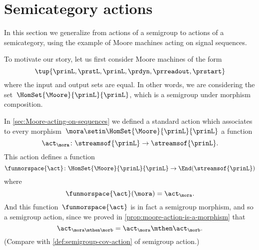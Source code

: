 
\section{Semicategory actions}
\label{sec:action-of-a-category}


In this section we generalize from actions of a semigroup to actions of a semicategory, using the example of Moore machines acting on signal sequences.

To motivate our story, let us first consider Moore machines of the form
\begin{equation}
    \tup{\prinL,\prstL,\prinL,\prdyn,\prreadout,\prstart}
\end{equation}
where the input and output sets are equal.
In other words, we are considering the set~$\HomSet{\Moore}{\prinL}{\prinL}$, which is a semigroup under morphism composition.

In \cref{sec:Moore-acting-on-sequences} we defined a standard action which associates to every morphism~$\mora \setin \HomSet{\Moore}{\prinL}{\prinL}$ a function
\begin{equation}
    \act_{\mora} \colon \streamsof{\prinL} \to \streamsof{\prinL}.
\end{equation}
This action defines a function
\begin{equation}
    \funmorspace{\act} \colon  \HomSet{\Moore}{\prinL}{\prinL} \to \End (\streamsof{\prinL})
\end{equation}
where
\begin{equation}
    \funmorspace{\act}(\mora) = \act_{\mora}.
\end{equation}
And this function~$\funmorspace{\act}$ is in fact a semigroup morphism, and so a semigroup action, since we proved in \cref{prop:moore-action-is-a-morphism} that
\begin{equation}
    \act_{\mora \mthen \morb} = \act_\mora \mthen \act_\morb.
\end{equation}
(Compare with \cref{def:semigroup-cov-action} of semigroup action.)

